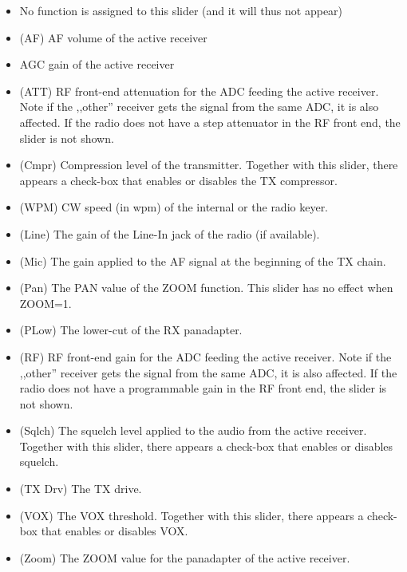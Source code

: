 \documentclass[12pt]{book}
\def\rett#1{\texttt{\color{red}#1}}
\begin{document}
\begin{itemize}
\item[\rett{None}]{No function is assigned to this slider (and it will thus not appear)}
\item[\rett{AF Gain}]{(AF) AF volume of the active receiver}
\item[\rett{AGC Gain}]{AGC gain of the active receiver}
\item[\rett{Atten}]{(ATT) RF front-end attenuation for the ADC feeding the active receiver. Note if the ,,other''
receiver gets the signal from the same ADC, it is also affected. If the radio does not have a step attenuator
in the RF front end, the slider is not shown.}
\item[\rett{Cmpr Lvl}]{(Cmpr) Compression level of the transmitter. Together with this slider, there appears a
check-box that enables or disables the TX compressor.}
\item[\rett{CW Speed}]{(WPM) CW speed (in wpm) of the internal or the radio keyer.}
\item[\rett{Linein Gain}]{(Line) The gain of the Line-In jack of the radio (if available).}
\item[\rett{Mic Gain}]{(Mic) The gain applied to the AF signal at the beginning of the TX chain.}
\item[\rett{PanZoom}]{(Pan) The PAN value of the ZOOM function. This slider has no effect when ZOOM=1.}
\item[\rett{Panadapter Low}]{(PLow) The lower-cut of the RX panadapter.}
\item[\rett{RF Gain}]{(RF) RF front-end gain for the ADC feeding the active receiver. Note if the ,,other''
receiver gets the signal from the same ADC, it is also affected. If the radio does not have a programmable
gain in the RF front end, the slider is not shown.}
\item[\rett{Squelch}]{(Sqlch) The squelch level applied to the audio from the active receiver. Together with this
slider, there appears a check-box that enables or disables squelch.}
\item[\rett{TX Drive}]{(TX Drv) The TX drive.}
\item[\rett{VOX Level}]{(VOX) The VOX threshold. Together with this slider, there appears a check-box that enables or disables VOX.}
\item[\rett{Zoom}]{(Zoom) The ZOOM value for the panadapter of the active receiver.}
\end{itemize}


\end{document}
